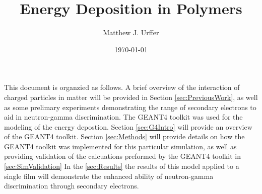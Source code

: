 \documentclass[]{report}
\title{Energy Deposition in Polymers}
\author{Matthew J. Urffer}
\date{\today}
\numberwithin{equation}{section}
\begin{document}
\maketitle

\listoftodos


This document is organzied as follows.
A brief overview of the interaction of charged particles in matter will be provided in Section \ref{sec:PreviousWork}, as well as some prelimary experiments demonstrating the range of secondary electrons to aid in neutron-gamma discrimination.
The GEANT4 toolkit was used for the modeling of the energy depostion.  Section \ref{sec:G4Intro} will provide an overview of the GEANT4 toolkit.
Section \ref{sec:Methods} will provide details on how the GEANT4 toolkit was implemented for this particular simulation, as well as providing validation of the calcuations preformed by the GEANT4 toolkit in \ref{sec:SimValidation}
In the \ref{sec:Results} the results of this model applied to a single film will demonstrate the enhanced ability of neutron-gamma discrimination through secondary electrons.






\end{document}
